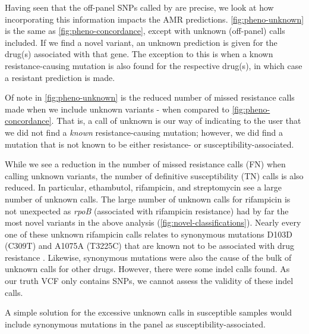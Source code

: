 Having seen that the off-panel SNPs called by \drprg{} are precise, we look at how incorporating this information impacts the AMR predictions. \autoref{fig:pheno-unknown} is the same as \autoref{fig:pheno-concordance}, except with unknown (off-panel) calls included. If we find a novel variant, an unknown prediction is given for the drug(s) associated with that gene. The exception to this is when a known resistance-causing mutation is also found for the respective drug(s), in which case a resistant prediction is made.

Of note in \autoref{fig:pheno-unknown} is the reduced number of missed resistance calls made when we include unknown variants - when compared to \autoref{fig:pheno-concordance}. That is, a call of unknown is our way of indicating to the user that we did not find a \emph{known} resistance-causing mutation; however, we did find a mutation that is not known to be either resistance- or susceptibility-associated.

While we see a reduction in the number of missed resistance calls (FN) when calling unknown variants, the number of definitive susceptibility (TN) calls is also reduced. In particular, ethambutol, rifampicin, and streptomycin see a large number of unknown calls. The large number of unknown calls for rifampicin is not unexpected as \textit{rpoB} (associated with rifampicin resistance) had by far the most novel variants in the above analysis (\autoref{fig:novel-classifications}). Nearly every one of these unknown rifampicin calls relates to synonymous mutations D103D (C309T) and A1075A (T3225C) that are known not to be associated with drug resistance \cite{Jagielski2018}. Likewise, synonymous mutations were also the cause of the bulk of unknown calls for other drugs. However, there were some indel calls found. As our truth VCF only contains SNPs, we cannot assess the validity of these indel calls.

A simple solution for the excessive unknown calls in susceptible samples would include synonymous mutations in the panel as susceptibility-associated.

